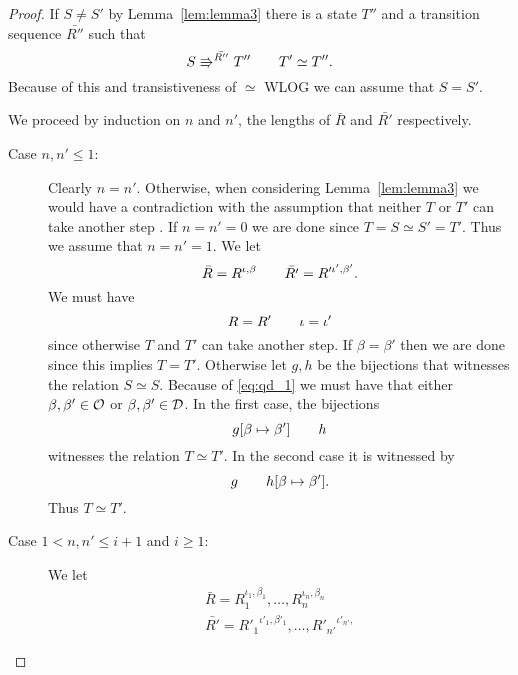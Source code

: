 \begin{proof}
  If $S \neq S'$ by Lemma~\ref{lem:lemma3} there is a state $T''$ and a
  transition sequence $\bar{R''}$ such that
  \begin{equation}
    S \Rrightarrow^{\bar{R''}} T'' \quad\quad T' \simeq T''.
  \end{equation}
  Because of this and transistiveness of $\simeq$ WLOG we can assume that $S =
  S'$.

  We proceed by induction on $n$ and $n'$, the lengths of $\bar{R}$ and
  $\bar{R'}$ respectively.
  \begin{description}
    \item[Case $n, n' \leq 1$:] Clearly $n = n'$. Otherwise, when considering
      Lemma~\ref{lem:lemma3} we would have a contradiction with the assumption
      that neither $T$ or $T'$ can take another step .
      If $n = n' = 0$ we are done since $T = S \simeq S' = T'$. Thus we assume
      that $n = n' = 1$. We let
      \begin{equation*}
        \bar{R} = R^{\iota, \beta} \quad\quad \bar{R'} = R'^{\iota', \beta'}.
      \end{equation*}
      We must have 
      \begin{equation} \label{eq:qd_1}
        R = R' \quad\quad \iota = \iota'
      \end{equation} 
      since otherwise $T$ and $T'$ can take another step.  If $\beta = \beta'$
      then we are done since this implies $T = T'$.  Otherwise let $g, h$ be the
      bijections that witnesses the relation $S \simeq S$. Because of
      \eqref{eq:qd_1} we must have that either $\beta, \beta' \in \mathcal{O}$ or
      $\beta, \beta' \in \mathcal{D}$. In the first case, the bijections
      \begin{equation}
        g[\beta \mapsto \beta'] \quad\quad h
      \end{equation}
      witnesses the relation $T \simeq T'$. In the second case it is witnessed
      by
      \begin{equation*}
        g \quad\quad h[\beta \mapsto \beta'].
      \end{equation*}
      Thus $T \simeq T'$.
    \item[Case $1 < n, n' \leq i+1$ and $i \geq 1$:] We let 
      \begin{equation*}
        \begin{gathered}
          \bar{R} = R_1^{\iota_1, \beta_1}, \dots, R_n^{\iota_n, \beta_n} \\
          \bar{R'} = {R'_1}^{\iota'_1, \beta'_1}, \dots, {R'_{n'}}^{\iota'_{n'},
}
\end{gathered}
\end{equation*}
\end{description}
\end{proof}
